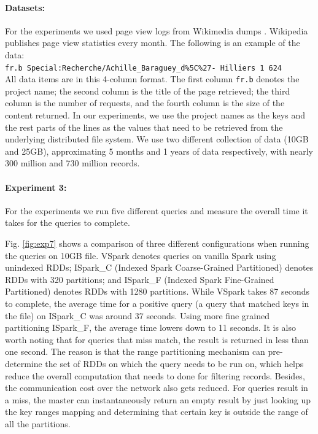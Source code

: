 \paragraph{Datasets:} For the experiments we used page view logs from
Wikimedia dumps \cite{wikimedia}. Wikipedia publishes page view
statistics every month.  The following is an example of the data:\\
\texttt{fr.b Special:Recherche/Achille\_Baraguey\_d\%5C\%27- Hilliers 1
624} \\
All data items are in this 4-column format. The first column
\texttt{fr.b} denotes the project name; the second column is the title
of the page retrieved; the third column is the number of requests, and
the fourth column is the size of the content returned.
In our experiments, we use the project names as the keys and the rest
parts of the lines as the values that need to be retrieved from the
underlying distributed file system.  We use two different collection of
data (10GB and 25GB), approximating 5 months and 1 years of data
respectively, with nearly 300 million and 730 million records. 

\paragraph{Experiment 3:}
For the experiments we run five different queries and measure the
overall time it takes for the queries to complete. 

Fig. \ref{fig:exp7} shows a comparison of three different configurations
when running the queries on 10GB file. VSpark denotes queries on vanilla
Spark using unindexed RDDs; ISpark\_C (Indexed Spark Coarse-Grained
Partitioned) denotes RDDs with 320 partitions; and ISpark\_F (Indexed
Spark Fine-Grained Partitioned) denotes RDDs with 1280 partitions. While VSpark
takes 87 seconds to complete, the average time for a positive query (a
query that matched keys in the file) on ISpark\_C was around 37 seconds.
Using more fine grained partitioning ISpark\_F, the average time lowers
down to 11 seconds. It is also worth noting that for queries that miss
match, the result is returned in less than one second. The reason is
that the range partitioning mechanism can pre-determine the set of RDDs
on which the query needs to be run on, which helps reduce the overall
computation that needs to done for filtering records. Besides, the
communication cost over the network also gets reduced.  For queries
result in a miss, the master can instantaneously return an empty result
by just looking up the key ranges mapping and determining that certain
key is outside the range of all the partitions.

